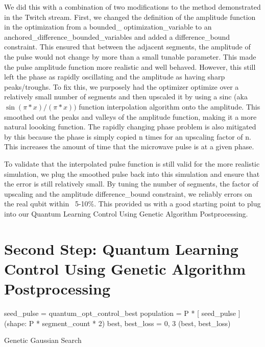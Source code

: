 \documentclass{article}
\begin{document}
We did this with a combination of two modifications to the method demonstrated in the 
Twitch stream. First, we changed the definition of the amplitude function in the optimization from a bounded\_
optimization\_variable to an anchored\_difference\_bounded\_variables and added a difference\_bound constraint. 
This ensured that between the adjacent segments, the amplitude of the pulse would not change by more than a 
small tunable parameter. This made the pulse amplitude function more realistic and well behaved. However, 
this still left the phase as rapidly oscillating and the amplitude as having sharp peaks/troughs. To fix 
this, we purposely had the optimizer optimize over a relatively small number of segments and then upscaled 
it by using a sinc (aka $\sin(\pi * x) / (\pi * x))$ function interpolation algorithm onto the amplitude. This 
smoothed out the peaks and valleys of the amplitude function, making it a more natural loooking function. 
The rapidly changing phase problem is also mitigated by this because the phase is simply copied n times for 
an upscaling factor of n. This increases the amount of time that the microwave pulse is at a given phase. 

To validate that the interpolated pulse function is still valid for the more realistic simulation, we plug 
the smoothed pulse back into this simulation and ensure that the error is still relatively small. By 
tuning the number of segments, the factor of upscaling and the amplitude difference\_bound constraint, 
we reliably errors on the real qubit within ~5-10\%. This provided us with a good starting point to plug 
into our Quantum Learning Control Using Genetic Algorithm Postprocessing.

\section{Second Step: Quantum Learning Control Using Genetic Algorithm Postprocessing}
\begin{algorithm}[H]
\SetAlgoLined
{}
    seed\_pulse = quantum\_opt\_control\_best\;
    population = P * [ seed\_pulse ] (shape: P * segment\_count * 2)\;
    best, best\_loss = 0, 3\;
    \Return (best, best\_loss)
\caption{Genetic Gaussian Search}
\end{algorithm}
\end{document}
